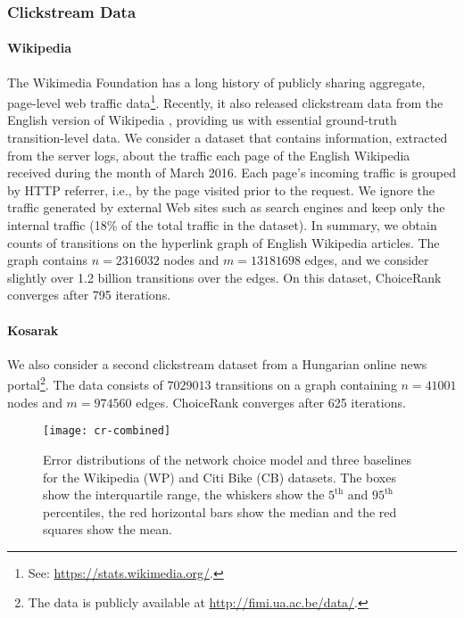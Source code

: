 \subsubsection{Clickstream Data}

\paragraph{Wikipedia}
The Wikimedia Foundation has a long history of publicly sharing aggregate, page-level web traffic data\footnote{See: \url{https://stats.wikimedia.org/}.}.
Recently, it also released clickstream data from the English version of Wikipedia \citep{wulczyn2016wikipedia}, providing us with essential ground-truth transition-level data.
We consider a dataset that contains information, extracted from the server logs, about the traffic each page of the English Wikipedia received during the month of March 2016.
Each page's incoming traffic is grouped by HTTP referrer, i.e., by the page visited prior to the request.
We ignore the traffic generated by external Web sites such as search engines and keep only the internal traffic (\num{18}\% of the total traffic in the dataset).
In summary, we obtain counts of transitions on the hyperlink graph of English Wikipedia articles.
The graph contains $n = \num{2316032}$ nodes and $m = \num{13181698}$ edges, and we consider slightly over \num{1.2} billion transitions over the edges.
On this dataset, ChoiceRank converges after \num{795} iterations.

\paragraph{Kosarak}
We also consider a second clickstream dataset from a Hungarian online news portal\footnote{The data is publicly available at \url{http://fimi.ua.ac.be/data/}.}.
The data consists of $\num{7029013}$ transitions on a graph containing $n = 41001$ nodes and $m = \num{974560}$ edges.
ChoiceRank converges after \num{625} iterations.

\begin{figure*}[t]
  \centering
  \texttt{[image: cr-combined]}
  \caption{
Error distributions of the network choice model and three baselines for the Wikipedia (WP) and Citi Bike (CB) datasets.
The boxes show the interquartile range, the whiskers show the $5^{\text{th}}$ and $95^{\text{th}}$ percentiles, the red horizontal bars show the median and the red squares show the mean.
}
  \label{cr:fig:results}
\end{figure*}

